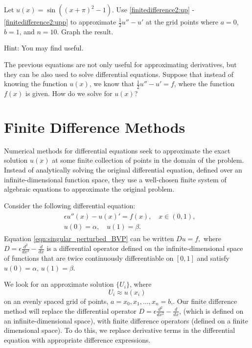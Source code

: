 \begin{problem}
	Let $u(x) = \sin((x+\pi)^2-1)$.
	Use \eqref{finitedifference2:up} - \eqref{finitedifference2:upp} to approximate $\frac{1}{2}u'' - u'$ at the grid points where $a=0$, $b=1$, and $n=10$.
	Graph the result.

    Hint: You may find  useful.
\end{problem}

The previous equations are not only useful for approximating derivatives, but they can be also used to solve differential equations.
Suppose that instead of knowing the function $u(x)$, we know that $\frac{1}{2}u'' - u' = f$, where the function $f(x)$ is given.
How do we solve for $u(x)$?

\section*{Finite Difference Methods}

Numerical methods for differential equations seek to approximate the exact solution $u(x)$ at some finite collection of points in the domain of the problem.
Instead of analytically solving the original differential equation, defined over an infinite-dimensional function space, they use a well-chosen finite system of algebraic equations to approximate the original problem.

Consider the following differential equation:
\begin{align}
	\begin{split}
	&{ } \epsilon u''(x)-u(x)'= f(x), \quad x \in (0,1), \\
	&{ } u(0) = \alpha, \quad u(1) = \beta.
	\end{split} \label{eqn:singular_perturbed_BVP}
\end{align}
Equation \eqref{eqn:singular_perturbed_BVP} can be written $D u = f,$ where $D = \epsilon \frac{d^2}{dx^2} - \frac{d}{dx}$ is a differential operator defined on the infinite-dimensional space of functions that are twice continuously differentiable on $[0,1]$ and satisfy $u(0) = \alpha$, $u(1) = \beta$.

We look for an approximate solution $\{U_i\}$, where \[U_i \approx u(x_i)\] on an evenly spaced grid of points, $a = x_0, x_1, \ldots, x_n = b$,.
Our finite difference method will replace the differential operator $D = \epsilon \frac{d^2}{dx^2} - \frac{d}{dx}$, (which is defined on an infinite-dimensional space), with finite difference operators (defined on a finite dimensional space).
To do this, we replace derivative terms in the differential equation with appropriate difference expressions.


